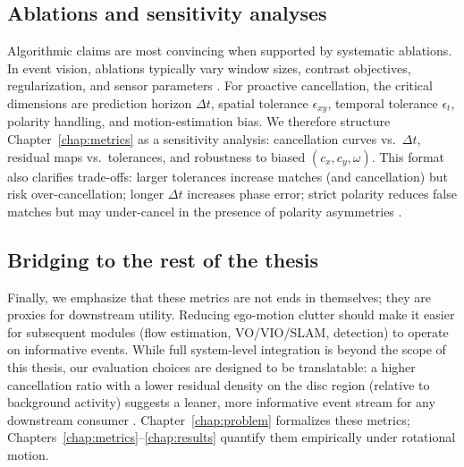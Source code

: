 \subsection{Ablations and sensitivity analyses}
Algorithmic claims are most convincing when supported by systematic ablations. In event vision, ablations typically vary window sizes, contrast objectives, regularization, and sensor parameters \cite{Gallego2018CMax,Rebecq2017EVO}. For proactive cancellation, the critical dimensions are prediction horizon $\Delta t$, spatial tolerance $\epsilon_{xy}$, temporal tolerance $\epsilon_t$, polarity handling, and motion-estimation bias. We therefore structure Chapter~\ref{chap:metrics} as a sensitivity analysis: cancellation curves vs.\ $\Delta t$, residual maps vs.\ tolerances, and robustness to biased $(c_x,c_y,\omega)$. This format also clarifies trade-offs: larger tolerances increase matches (and cancellation) but risk over-cancellation; longer $\Delta t$ increases phase error; strict polarity reduces false matches but may under-cancel in the presence of polarity asymmetries \cite{Gallego2020Survey,Delbruck2020Handbook}.

\subsection{Bridging to the rest of the thesis}
Finally, we emphasize that these metrics are not ends in themselves; they are proxies for downstream utility. Reducing ego-motion clutter should make it easier for subsequent modules (flow estimation, VO/VIO/SLAM, detection) to operate on informative events. While full system-level integration is beyond the scope of this thesis, our evaluation choices are designed to be translatable: a higher cancellation ratio with a lower residual density on the disc region (relative to background activity) suggests a leaner, more informative event stream for any downstream consumer \cite{Gallego2020Survey}. Chapter~\ref{chap:problem} formalizes these metrics; Chapters~\ref{chap:metrics}–\ref{chap:results} quantify them empirically under rotational motion.

